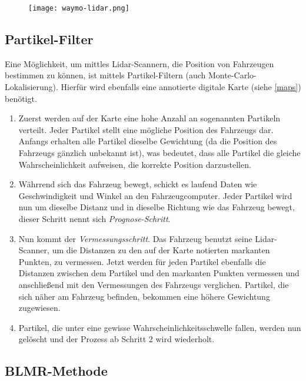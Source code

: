 \begin{figure}\centering
  \texttt{[image: waymo-lidar.png]}
  \label{waymo-lidar}
\end{figure}

\subsection{Partikel-Filter}

Eine Möglichkeit, um mittles \acs{Lidar}-Scannern, die Position von Fahrzeugen bestimmen zu können, ist mittels Partikel-Filtern (auch Monte-Carlo-Lokalisierung). Hierfür wird ebenfalls eine annotierte digitale Karte (siehe \ref{maps}) benötigt.

\begin{enumerate}
  \item{Zuerst werden auf der Karte eine hohe Anzahl an sogenannten Partikeln verteilt. Jeder Partikel stellt eine mögliche Position des Fahrzeugs dar. Anfangs erhalten alle Partikel dieselbe Gewichtung (da die Position des Fahrzeugs gänzlich unbekannt ist), was bedeutet, dass alle Partikel die gleiche Wahrscheinlichkeit aufweisen, die korrekte Position darzustellen.}

  \item{Währrend sich das Fahrzeug bewegt, schickt es laufend Daten wie Geschwindigkeit und Winkel an den Fahrzeugcomputer. Jeder Partikel wird nun um dieselbe Distanz und in dieselbe Richtung wie das Fahrzeug bewegt, dieser Schritt nennt sich \textit{Prognose-Schritt}}.

  \item{Nun kommt der \textit{Vermessungsschritt}. Das Fahrzeug benutzt seine \acs{Lidar}-Scanner}, um die Distanzen zu den auf der Karte notierten markanten Punkten, zu vermessen. Jetzt werden für jeden Partikel ebenfalls die Distanzen zwischen dem Partikel und den markanten Punkten vermessen und anschließend mit den Vermessungen des Fahrzeugs verglichen. Partikel, die sich näher am Fahrzeug befinden, bekommen eine höhere Gewichtung zugewiesen.

  \item{Partikel, die unter eine gewisse Wahrscheinlichkeitsschwelle fallen, werden nun gelöscht und der Prozess ab Schritt 2 wird wiederholt.}
\end{enumerate}

\subsection{BLMR-Methode}

